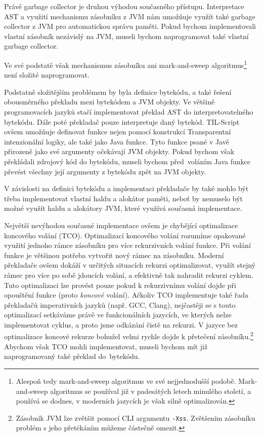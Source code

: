 Právě garbage collector je druhou výhodou současného přístupu. Interpretace AST a využití mechanismu
zásobníku z JVM nám umožňuje využít také garbage collector z JVM pro automatickou správu paměti.
Pokud bychom implementovali vlastní zásobník nezávislý na JVM, museli bychom naprogramovat také
vlastní garbage collector.

Ve své podstatě však mechanismus zásobníku ani mark-and-sweep algoritmus\footnote{Alespoň tedy
  mark-and-sweep algoritmus ve své nejjednodušší podobě. Mark-and-sweep algoritmus se používal již
  v padesátých letech minulého století\cite{lisp-src}, a používá se dodnes, v moderních jazycích je
  však silně optimalizován.} není složité naprogramovat.

Podstatně složitějším problémem by byla definice bytekódu, a také řešení obousměrného překladu mezi
bytekódem a JVM objekty. Ve většině programovacích jazyků stačí implementovat překlad AST
do interpretovatelného bytekódu. Dále poté překladač pouze interpretuje daný bytekód. TIL-Script
ovšem umožňuje definovat funkce nejen pomocí konstrukcí Transparentní intenzionální logiky, ale také
jako Java funkce. Tyto funkce psané v Javě přirozeně jako své argumenty očekávají JVM objekty.
Pokud bychom však překládali zdrojový kód do bytekódu, museli bychom před~voláním Java funkce
převést všechny její argumenty z bytekódu zpět na JVM objekty.

V závislosti na definici bytekódu a implementaci překladače by také mohlo být třeba implementovat
vlastní haldu a alokátor paměti, neboť by nemuselo být možné využít haldu a alokátory JVM, které
využívá současná implementace.

Největší nevýhodou současné implementace ovšem je chybějící optimalizace koncového volání
(TCO)\cite{sicp-src}.
Optimalizací koncového volání rozumíme opakované využití jednoho rámce zásobníku pro více
rekurzivních volání funkce. Při volání funkce je většinou potřeba vytvořit nový rámec na zásobníku.
Moderní překladače ovšem dokáží v určitých situacích rekurzi optimalizovat, využít stejný rámec
pro více po sobě jdoucích volání, a efektivně tak nahradit rekurzi cyklem. Tuto optimalizaci lze
provést pouze pokud k rekurzivnímu volání dojde při opouštění funkce (proto \textit{koncové}
volání). Ačkoliv TCO implementuje také řada překladačů imperativních jazyků (např. GCC, Clang),
nejčastěji se s touto optimalizací setkáváme právě ve funkcionálních jazycích, ve kterých nelze
implementovat cyklus, a proto jsme odkázání čistě na rekurzi. V jazyce bez optimalizace koncové
rekurze bohužel velmi rychle dojde k přetečení zásobníku.\footnote{
  Zásobník JVM lze zvětšit pomocí CLI argumentu \lstinline{-Xss}. Zvětšením zásobníku problém s jeho
  přetékáním můžeme částečně omezit.
} Abychom však TCO mohli implementovat, museli bychom mít již naprogramovaný také překlad
do~bytekódu.

